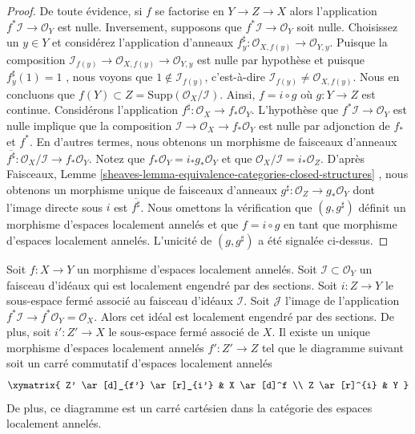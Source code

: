 \begin{proof}
De toute évidence, si  $f$  se factorise en  $Y \to Z \to X$  alors
l'application  $f^*\mathcal{I} \to \mathcal{O}_Y$  est nulle. Inversement, supposons que  $f^*\mathcal{I} \to \mathcal{O}_Y$  soit
nulle. Choisissez un  $y \in Y$ et considérez l'application
d'anneaux  $f^\sharp_y : \mathcal{O}_{X, f(y)} \to \mathcal{O}_{Y, y}$. Puisque la composition  $\mathcal{I}_{f(y)} \to \mathcal{O}_{X, f(y)} \to \mathcal{O}_{Y, y}$  est nulle par
hypothèse et puisque  $f^\sharp_y(1) = 1$ , nous voyons que  $1 \not \in \mathcal{I}_{f(y)}$, c'est-à-dire
 $\mathcal{I}_{f(y)} \not = \mathcal{O}_{X, f(y)}$. Nous en concluons que  $f(Y) \subset Z = \text{Supp}(\mathcal{O}_X/\mathcal{I})$. Ainsi,  $f = i \circ g$  où
 $g : Y \to Z$  est continue. Considérons l'application  $f^\sharp : \mathcal{O}_X \to f_*\mathcal{O}_Y$. L'hypothèse que
 $f^*\mathcal{I} \to \mathcal{O}_Y$  est nulle implique que la composition  $\mathcal{I} \to \mathcal{O}_X \to f_*\mathcal{O}_Y$  est nulle par
adjonction de  $f_*$  et  $f^*$. En d'autres termes, nous obtenons un
morphisme de faisceaux d'anneaux  $\overline{f^\sharp} : \mathcal{O}_X/\mathcal{I} \to f_*\mathcal{O}_Y$. Notez que  $f_*\mathcal{O}_Y = i_*g_*\mathcal{O}_Y$  et que
 $\mathcal{O}_X/\mathcal{I} = i_*\mathcal{O}_Z$. D'après Faisceaux, Lemme  \ref{sheaves-lemma-equivalence-categories-closed-structures} , nous obtenons un
morphisme unique de faisceaux d'anneaux  $g^\sharp : \mathcal{O}_Z \to g_*\mathcal{O}_Y$  dont l'image directe sous
 $i$  est  $\overline{f^\sharp}$. Nous omettons la vérification que  $(g, g^\sharp)$ 
définit un morphisme d'espaces localement annelés et que  $f = i \circ g$  en tant que
morphisme d'espaces localement annelés. L'unicité de  $(g, g^\sharp)$  a été signalée
ci-dessus.
\end{proof}

\begin{lemma}
\label{lemma-restrict-map-to-closed}
Soit  $f : X \to Y$  un morphisme d'espaces localement annelés. Soit  $\mathcal{I} \subset \mathcal{O}_Y$  un
faisceau d'idéaux qui est localement engendré par des sections. Soit  $i : Z \to Y$ 
le sous-espace fermé associé au faisceau d'idéaux  $\mathcal{I}$. Soit  $\mathcal{J}$ 
l'image de l'application  $f^*\mathcal{I} \to f^*\mathcal{O}_Y = \mathcal{O}_X$. Alors cet idéal est localement engendré par
des sections. De plus, soit  $i' : Z' \to X$  le sous-espace fermé associé de
 $X$. Il existe un unique morphisme d'espaces localement annelés
 $f' : Z' \to Z$  tel que le diagramme suivant soit un carré commutatif d'espaces
localement annelés
$$
\xymatrix{
Z' \ar[d]_{f'} \ar[r]_{i'} & X \ar[d]^f \\
Z \ar[r]^{i} & Y
}
$$
De plus, ce diagramme est un carré cartésien dans la catégorie des espaces
localement annelés.
\end{lemma}

